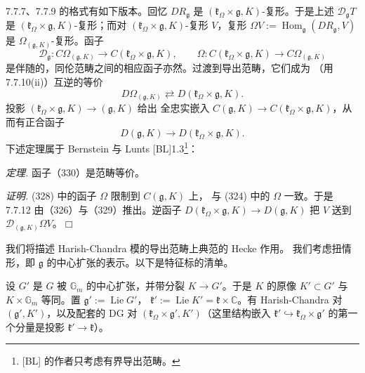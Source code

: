  7.7.7、7.7.9 的格式有如下版本。回忆 $DR_{\mathfrak{g}}$ 是
$(\mathfrak{k}_\Omega\times\mathfrak{g},K)$-复形。于是上述
$\mathcal{D}_{\mathfrak{g}}T$ 是
$(\mathfrak{k}_\Omega\times\mathfrak{g},K)$-复形；而对
$(\mathfrak{k}_\Omega\times\mathfrak{g},K)$-复形 $V$，复形
$\Omega V:=\operatorname{Hom}_{\mathfrak{g}}(DR_{\mathfrak{g}},V)$ 是
$\Omega_{(\mathfrak{g},K)}$-复形。函子
\begin{equation}\tag{328}
\mathcal{D}_{\mathfrak{g}}:C\Omega_{(\mathfrak{g},K)}\longrightarrow
C(\mathfrak{k}_\Omega\times\mathfrak{g},K),\qquad
\Omega:C(\mathfrak{k}_\Omega\times\mathfrak{g},K)\longrightarrow
C\Omega_{(\mathfrak{g},K)}
\end{equation}
是伴随的，同伦范畴之间的相应函子亦然。过渡到导出范畴，它们成为
（用 7.7.10(ii)）互逆的等价
\begin{equation}\tag{329}
D\Omega_{(\mathfrak{g},K)}\rightleftarrows
D(\mathfrak{k}_\Omega\times\mathfrak{g},K).
\end{equation}
投影 $(\mathfrak{k}_\Omega\times\mathfrak{g},K)\to(\mathfrak{g},K)$ 给出
全忠实嵌入 $C(\mathfrak{g},K)\to
C(\mathfrak{k}_\Omega\times\mathfrak{g},K)$，从而有正合函子
\begin{equation}\tag{330}
D(\mathfrak{g},K)\longrightarrow
D(\mathfrak{k}_\Omega\times\mathfrak{g},K).
\end{equation}
下述定理属于 Bernstein 与 Lunts [BL]1.3\footnote{[BL] 的作者只考虑有界导出范畴。}：


 \emph{定理.} 函子（330）是范畴等价。

\emph{证明.} (328) 中的函子 $\Omega$ 限制到 $C(\mathfrak{g},K)$ 上，
与 (324) 中的 $\Omega$ 一致。于是 7.7.12 由（326）与（329）推出。逆函子
$D(\mathfrak{k}_\Omega\times\mathfrak{g},K)\to D(\mathfrak{g},K)$ 把 $V$
送到 $\mathcal{D}_{(\mathfrak{g},K)}\Omega V$。\hfill$\Box$


 我们将描述 Harish-Chandra 模的导出范畴上典范的 Hecke 作用。
我们考虑扭情形，即 $\mathfrak{g}$ 的中心扩张的表示。以下是特征标的清单。

设 $G'$ 是 $G$ 被 $\mathbb{G}_m$ 的中心扩张，并带分裂 $K\to G'$。于是
$K$ 的原像 $K'\subset G'$ 与 $K\times\mathbb{G}_m$ 等同。置
$\mathfrak{g}':=\operatorname{Lie}G'$，
$\mathfrak{k}':=\operatorname{Lie}K'
=\mathfrak{k}\times\mathbb{C}$。有 Harish-Chandra 对
$(\mathfrak{g}',K')$，以及配套的 DG 对
$(\mathfrak{k}_\Omega\times\mathfrak{g}',K')$（这里结构嵌入
$\mathfrak{k}'\hookrightarrow
\mathfrak{k}_\Omega\times\mathfrak{g}'$ 的第一个分量是投影
$\mathfrak{k}'\to\mathfrak{k}$）。

